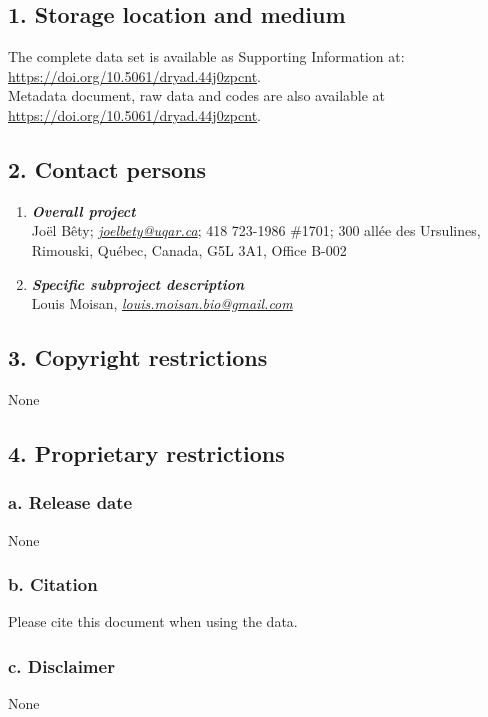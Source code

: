 \documentclass[a4paper,twoside,12pt]{article}
\begin{document}
                \subsection*{1. Storage location and medium}
The complete data set is available as Supporting Information at: \url{https://doi.org/10.5061/dryad.44j0zpcnt}.\\
Metadata document, raw data and codes are also available at \url{https://doi.org/10.5061/dryad.44j0zpcnt}.
                 
        \subsection*{2. Contact persons}
        \begin{enumerate}[label=\alph*.]
                        \item[] \textit{\textbf{Overall project}}\\
                        Joël Bêty; \textit{\href{mailto:joel_bety@uqar.ca}{joel{\textunderscore}bety@uqar.ca}}; 418 723-1986 \#1701; 300 allée des Ursulines, Rimouski, Québec, Canada, G5L 3A1, Office B-002
                        \item[] \textit{\textbf{Specific subproject description}}\\
                         Louis Moisan, \textit{\href{mailto:louis.moisan.bio@gmail.com}{louis.moisan.bio@gmail.com}}
                \end{enumerate}
                \subsection*{3. Copyright restrictions}
                None
                 
                \subsection*{4. Proprietary restrictions}
                        \subsubsection*{a. Release date} None
                        \subsubsection*{b. Citation}
                         Please cite this document when using the data.
                        \subsubsection*{c. Disclaimer} None
                        
\end{document}
